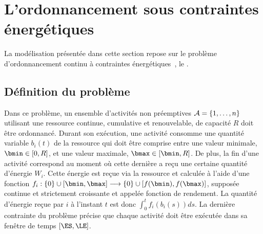 
\section{L'ordonnancement sous contraintes énergétiques}
\label{sec:ordo_nrj} 
La modélisation présentée dans cette section repose sur le problème
d'ordonnancement continu à contraintes
énergétiques~\cite{ArtiguesLopez}, le \CECSP.

\subsection{Définition du problème}

Dans ce problème, un ensemble d'activités non préemptives
${\cal A}=\{1,\dots,n\}$ utilisant une ressource continue, cumulative et
renouvelable, de capacité $R$ doit être ordonnancé. Durant son
exécution, une activité consomme une quantité variable $b_i(t)$ de la
ressource qui doit être comprise entre une valeur minimale, $\bmin \in
[0,R]$, et une valeur maximale, $\bmax \in [\bmin,R]$. De plus, la fin
d'une activité correspond au moment où cette dernière a reçu une
certaine quantité d'énergie $W_i$. Cette énergie est reçue via la
ressource et calculée à l'aide d'une fonction $f_i: \{0\} \cup
[\bmin,\bmax]\longrightarrow\{0\} \cup [f(\bmin),f(\bmax)]$, supposée
continue et strictement croissante et appelée fonction de rendement. La quantité
d'énergie reçue par $i$ à l'instant $t$ est donc $\int_{0}^t
f_i(b_i(s))ds$. La dernière contrainte du problème précise que chaque activité doit
être exécutée dans sa fenêtre de temps $[\ES,\LE]$.

